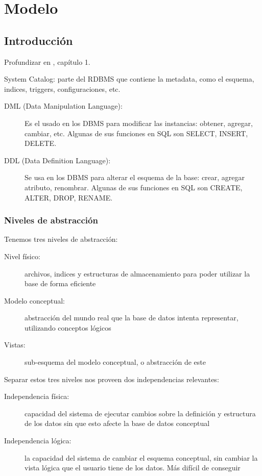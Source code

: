 \chapter{Modelo}

\section{Introducción}

Profundizar en \cite{molina2009}, capítulo 1.

System Catalog: parte del RDBMS que contiene la metadata, como el esquema, indices, triggers, configuraciones, etc.

\begin{description}
	\item[DML (Data Manipulation Language):] Es el usado en los DBMS para modificar las instancias: obtener,
agregar, cambiar, etc. Algunas de sus funciones en SQL son SELECT, INSERT, DELETE.
	\item[DDL (Data Definition Language):] Se usa en los DBMS para alterar el esquema de la base: crear, agregar
atributo, renombrar. Algunas de sus funciones en SQL son CREATE, ALTER, DROP, RENAME.
\end{description}

\subsection{Niveles de abstracción}

Tenemos tres niveles de abstracción:

\begin{description}
	\item[Nivel físico:] archivos, indices y estructuras de almacenamiento para poder utilizar la base de forma eficiente
	\item[Modelo conceptual:] abstracción del mundo real que la base de datos intenta representar, utilizando conceptos lógicos
	\item[Vistas:] sub-esquema del modelo conceptual, o abstracción de este
\end{description}

Separar estos tres niveles nos proveen dos independencias relevantes:

\begin{description}
	\item[Independencia física:] capacidad del sistema de ejecutar cambios sobre la definición y estructura de los datos sin que esto afecte la base de datos conceptual
	\item[Independencia lógica:] la capacidad del sistema de
cambiar el esquema conceptual, sin cambiar la vista
lógica que el usuario tiene de los datos. Más difícil de conseguir
\end{description}

